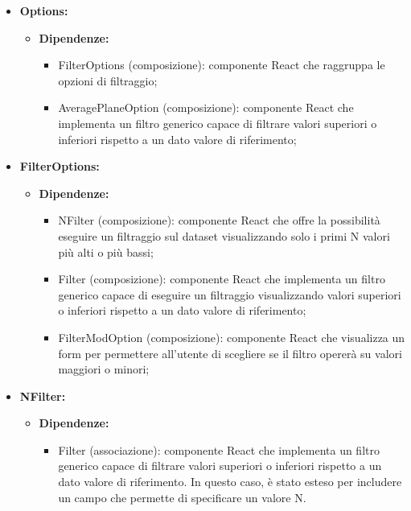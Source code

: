 \begin{itemize}
    \item \textbf{Options:}
          \begin{itemize}
              \item \textbf{Dipendenze:}
                    \begin{itemize}
                        \item FilterOptions (composizione): componente React che raggruppa le opzioni di
                              filtraggio;
                        \item AveragePlaneOption (composizione): componente React che implementa un filtro
                              generico capace di filtrare valori superiori o inferiori rispetto a un dato
                              valore di riferimento;
                    \end{itemize}
          \end{itemize}

    \item \textbf{FilterOptions:}
          \begin{itemize}
              \item \textbf{Dipendenze:}
                    \begin{itemize}
                        \item NFilter (composizione): componente React che offre la possibilità eseguire un
                              filtraggio sul dataset visualizzando solo i primi N valori più alti o più
                              bassi;
                        \item Filter (composizione): componente React che implementa un filtro generico
                              capace di eseguire un filtraggio visualizzando valori superiori o inferiori
                              rispetto a un dato valore di riferimento;
                        \item FilterModOption (composizione): componente React che visualizza un form per
                              permettere all'utente di scegliere se il filtro opererà su valori maggiori o
                              minori;
                    \end{itemize}
          \end{itemize}

    \item \textbf{NFilter:}
          \begin{itemize}
              \item \textbf{Dipendenze:}
                    \begin{itemize}
                        \item Filter (associazione): componente React che implementa un filtro generico
                              capace di filtrare valori superiori o inferiori rispetto a un dato valore di
                              riferimento. In questo caso, è stato esteso per includere un campo che permette
                              di specificare un valore N.
                    \end{itemize}
          \end{itemize}
\end{itemize}

